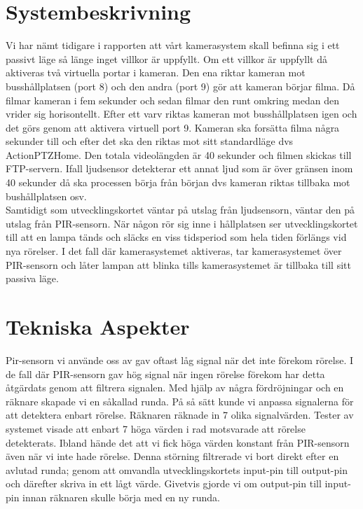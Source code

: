 \clearpage
\section{Systembeskrivning}
Vi har nämt tidigare i rapporten att vårt kamerasystem skall befinna sig i ett passivt läge så länge inget villkor är uppfyllt. Om ett villkor är uppfyllt då aktiveras två virtuella portar i kameran. Den ena riktar kameran mot busshållplatsen (port 8) och den andra (port 9) gör att kameran börjar filma. Då filmar kameran i fem sekunder och sedan filmar den runt omkring medan den vrider sig horisontellt. Efter ett varv riktas kameran mot busshållplatsen igen och det görs genom att aktivera virtuell port 9. Kameran ska forsätta filma några sekunder till och efter det ska den riktas mot sitt standardläge dvs ActionPTZHome. Den totala videolängden är 40 sekunder och filmen skickas till FTP-servern. Ifall ljudsensor detekterar ett annat ljud som är över gränsen inom 40 sekunder då ska processen börja från början dvs kameran riktas tillbaka mot bushållplatsen osv.\\
 Samtidigt som utvecklingskortet väntar på utslag från ljudsensorn, väntar den på utslag från PIR-sensorn. När någon rör sig inne i hållplatsen ser utvecklingskortet till att en lampa tänds och släcks en viss tidsperiod som hela tiden förlängs vid nya rörelser. I det fall där kamerasystemet aktiveras, tar kamerasystemet över PIR-sensorn och låter lampan att blinka tills kamerasystemet är tillbaka till sitt passiva läge.


\section{Tekniska Aspekter} 
Pir-sensorn vi använde oss av gav oftast låg signal när det inte förekom rörelse. I de fall där PIR-sensorn gav hög signal när ingen rörelse förekom har detta åtgärdats genom att filtrera signalen. Med hjälp av några fördröjningar och en räknare skapade vi en såkallad runda. På så sätt kunde vi anpassa signalerna för att detektera enbart rörelse. Räknaren räknade in 7 olika signalvärden. Tester av systemet visade att enbart 7 höga värden i rad motsvarade att rörelse detekterats. Ibland hände det att vi fick höga värden konstant från PIR-sensorn även när vi inte hade rörelse. Denna störning filtrerade vi bort direkt efter en avlutad runda; genom att omvandla utvecklingskortets input-pin till output-pin och därefter skriva in ett lågt värde. Givetvis gjorde vi om output-pin till input-pin innan räknaren skulle börja med en ny runda.

